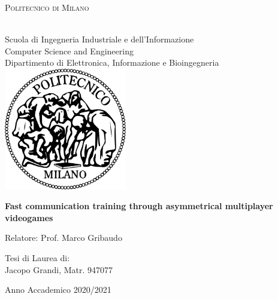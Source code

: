 \documentclass[12pt]{article}
\newcommand\blankpage{%
    \null
    \thispagestyle{empty}%
    \addtocounter{page}{-1}%
    \newpage}
\begin{document}
\setlength{\parindent}{0in}

\begin{titlepage}
\begin{center}

\begin{large} 
\textsc{Politecnico di Milano}
\end{large}
\\
Scuola di Ingegneria Industriale e dell’Informazione \\
Computer Science and Engineering \\
Dipartimento di Elettronica, Informazione e Bioingegneria \\

\vspace{0.8cm}
\includegraphics[width=0.4\textwidth]{poli}

\vspace{0.8cm}

\begin{Large}
\textbf{Fast communication training through asymmetrical multiplayer videogames}
\end{Large}

\vspace{2cm}

\begin{flushleft}
Relatore:
Prof. Marco Gribaudo
\end{flushleft}

\vspace{1cm}

\begin{flushright}
Tesi di Laurea di: \\
Jacopo Grandi, Matr. 947077
\end{flushright}

\vfill
Anno Accademico 2020/2021
\end{center}
\end{titlepage}

\clearpage

\afterpage{\blankpage}
\end{document}
